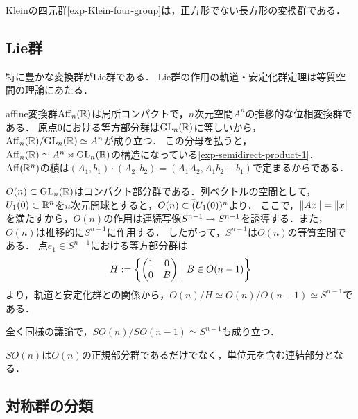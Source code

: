 \documentclass[uplatex,dvipdfmx]{jsreport}
\begin{document}
\begin{example}
    Kleinの四元群\ref{exp-Klein-four-group}は，正方形でない長方形の変換群である．
\end{example}

\subsection{Lie群}

\begin{tcolorbox}[colframe=ForestGreen, colback=ForestGreen!10!white,breakable,colbacktitle=ForestGreen!40!white,coltitle=black,fonttitle=\bfseries\sffamily,
title=]
    特に豊かな変換群がLie群である．
    Lie群の作用の軌道・安定化群定理は等質空間の理論にあたる．
\end{tcolorbox}

\begin{example}[affine空間]
    affine変換群$\mathrm{Aff}_n(\mathbb{R})$は局所コンパクトで，$n$次元空間$A^n$の推移的な位相変換群である．
    原点$0$における等方部分群は$\mathrm{GL}_n(\mathbb{R})$に等しいから，$\mathrm{Aff}_n(\mathbb{R})/\mathrm{GL}_n(\mathbb{R})\simeq A^n$が成り立つ．
    この分母を払うと，$\mathrm{Aff}_n(\mathbb{R})\simeq A^n\rtimes\mathrm{GL}_n(\mathbb{R})$の構造になっている\ref{exp-semidirect-product-1}．
    $\mathrm{Aff}(\mathbb{R}^n)$の積は$(A_1,b_1)\cdot(A_2,b_2)=(A_1A_2,A_1b_2+b_1)$で定まるからである．
\end{example}


\begin{example}[直交群の等質空間としての単位球面]
    $O(n)\subset\mathrm{GL}_n(\mathbb{R})$はコンパクト部分群である．列ベクトルの空間として，$U_1(0)\subset\mathbb{R}^n$を$n$次元開球とすると，$O(n)\subset\overline{(}U_1(0))^n$より．
    ここで，$\|Ax\|=\|x\|$を満たすから，$O(n)$の作用は連続写像$S^{n-1}\twoheadrightarrow S^{n-1}$を誘導する．また，$O(n)$は推移的に$S^{n-1}$に作用する．
    したがって，$S^{n-1}$は$O(n)$の等質空間である．
    点$e_1\in S^{n-1}$における等方部分群は
    \[H:=\left\{\begin{pmatrix}1&0\\0&B\end{pmatrix}\;\middle|\;B\in O(n-1)\right\}\]
    より，軌道と安定化群との関係から，$O(n)/H\simeq O(n)/O(n-1)\simeq S^{n-1}$である．

    全く同様の議論で，$SO(n)/SO(n-1)\simeq S^{n-1}$も成り立つ．

    $SO(n)$は$O(n)$の正規部分群であるだけでなく，単位元を含む連結部分となる．
\end{example}

\subsection{対称群の分類}
\end{document}

